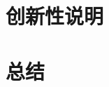 \documentclass[12pt,a4paper]{ctexart}
\numberwithin{figure}{section}
\begin{document}
\section{创新性说明}

\section{总结}
\clearpage
\pagestyle{refStyle}


\end{document}
